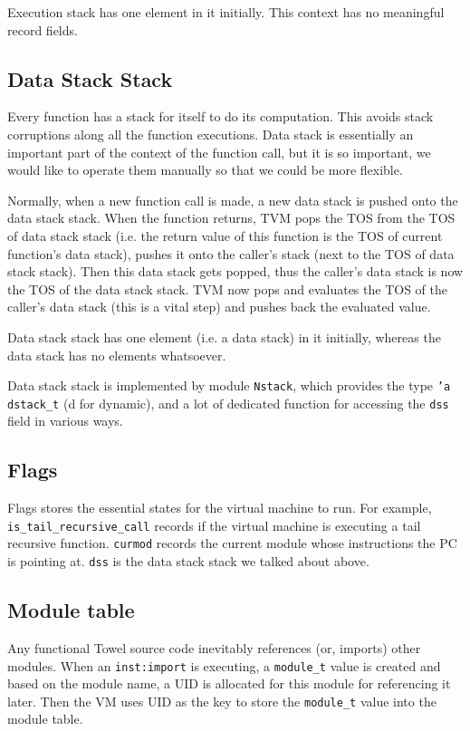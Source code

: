 \documentclass{article}
\newcommand{\inst}[1] {\texttt{inst:#1}}
\begin{document}
Execution stack has one element in it initially. This context has no meaningful record fields.

\subsection{Data Stack Stack}

Every function has a stack for itself to do its computation. This avoids stack corruptions along all the function executions. Data stack is essentially an important part of the context of the function call, but it is so important, we would like to operate them manually so that we could be more flexible.

Normally, when a new function call is made, a new data stack is pushed onto the data stack stack. When the function returns, TVM pops the TOS from the TOS of data stack stack (i.e. the return value of this function is the TOS of current function's data stack), pushes it onto the caller's stack (next to the TOS of data stack stack). Then this data stack gets popped, thus the caller's data stack is now the TOS of the data stack stack. TVM now pops and evaluates the TOS of the caller's data stack (this is a vital step) and pushes back the evaluated value.

Data stack stack has one element (i.e. a data stack) in it initially, whereas the data stack has no elements whatsoever.

Data stack stack is implemented by module \texttt{Nstack}, which provides the type \texttt{'a dstack\_t} (d for dynamic), and a lot of dedicated function for accessing the \texttt{dss} field in various ways.

\subsection{Flags}

Flags stores the essential states for the virtual machine to run. For example, \texttt{is\_tail\_recursive\_call} records if the virtual machine is executing a tail recursive function. \texttt{curmod} records the current module whose instructions the PC is pointing at. \texttt{dss} is the data stack stack we talked about above.

\subsection{Module table}

Any functional Towel source code inevitably references (or, imports) other modules. When an \inst{import} is executing, a \texttt{module\_t} value is created and based on the module name, a UID is allocated for this module for referencing it later. Then the VM uses UID as the key to store the \texttt{module\_t} value into the module table.
\end{document}

